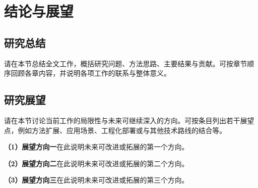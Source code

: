 
\chapter{结论与展望}

\section*{研究总结}

请在本节总结全文工作，概括研究问题、方法思路、主要结果与贡献。可按章节顺序回顾各章内容，并说明各项工作的联系与整体意义。

\section*{研究展望}

请在本节讨论当前工作的局限性与未来可继续深入的方向。可按条目列出若干展望点，例如方法扩展、应用场景、工程化部署或与其他技术路线的结合等。

\noindent\textbf{（1）展望方向一}\enspace 在此说明未来可改进或拓展的第一个方向。

\noindent\textbf{（2）展望方向二}\enspace 在此说明未来可改进或拓展的第二个方向。

\noindent\textbf{（3）展望方向三}\enspace 在此说明未来可改进或拓展的第三个方向。
